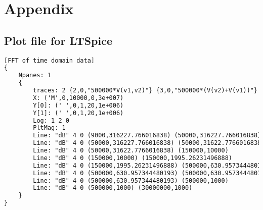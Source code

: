 \chapter{Appendix}
\label{chapter:Appendix}

\section{Plot file for LTSpice}

\begin{lstlisting}[language=TeX]
[FFT of time domain data]
{
    Npanes: 1
    {
        traces: 2 {2,0,"500000*V(v1,v2)"} {3,0,"500000*(V(v2)+V(v1))"}
        X: ('M',0,10000,0,3e+007)
        Y[0]: (' ',0,1,20,1e+006)
        Y[1]: (' ',0,1,20,1e+006)
        Log: 1 2 0
        PltMag: 1
        Line: "dB" 4 0 (9000,316227.766016838) (50000,316227.766016838)
        Line: "dB" 4 0 (50000,316227.766016838) (50000,31622.7766016838)
        Line: "dB" 4 0 (50000,31622.7766016838) (150000,10000)
        Line: "dB" 4 0 (150000,10000) (150000,1995.26231496888)
        Line: "dB" 4 0 (150000,1995.26231496888) (500000,630.957344480193)
        Line: "dB" 4 0 (500000,630.957344480193) (500000,630.957344480193)
        Line: "dB" 4 0 (500000,630.957344480193) (500000,1000)
        Line: "dB" 4 0 (500000,1000) (30000000,1000)
    }
}
\end{lstlisting}

